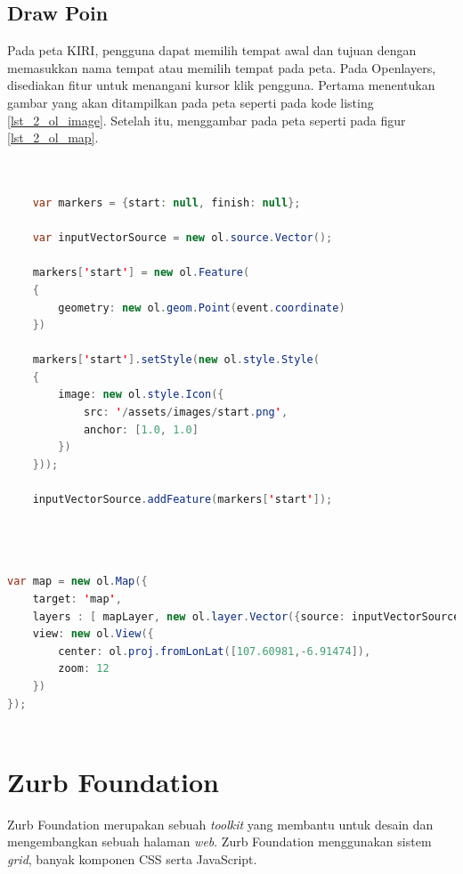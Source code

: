 \subsection{Draw Poin}
Pada peta KIRI, pengguna dapat memilih tempat awal dan tujuan dengan memasukkan nama tempat atau memilih tempat pada peta. Pada Openlayers, disediakan fitur untuk menangani kursor klik pengguna. Pertama menentukan gambar yang akan ditampilkan pada peta seperti pada kode listing \ref{lst_2_ol_image}. Setelah itu, menggambar pada peta seperti pada figur \ref{lst_2_ol_map}.


\begin{lstlisting}[caption=Menentukan gambar yang akan dipakai pada peta,label = {lst_2_ol_image},language=Java]

	
	var markers = {start: null, finish: null};
	
	var inputVectorSource = new ol.source.Vector();

	markers['start'] = new ol.Feature(
	{
		geometry: new ol.geom.Point(event.coordinate)
	})
	
	markers['start'].setStyle(new ol.style.Style(
	{
		image: new ol.style.Icon({
			src: '/assets/images/start.png',
			anchor: [1.0, 1.0]
		})
	}));
	
	inputVectorSource.addFeature(markers['start']);
	
	
\end{lstlisting}


\begin{lstlisting}[caption=Menambahkan vektor pada peta,label = {lst_2_ol_map},language=Java]
	
var map = new ol.Map({
    target: 'map',
    layers : [ mapLayer, new ol.layer.Vector({source: inputVectorSource}), new ol.layer.Vector({source: resultVectorSource}) ],
    view: new ol.View({
        center: ol.proj.fromLonLat([107.60981,-6.91474]),
        zoom: 12
    })
});
		
\end{lstlisting}

\section{Zurb Foundation}
\label{sec:zurbfoundation}

Zurb Foundation \cite{zurbfoundationbook} merupakan sebuah \textit{toolkit} yang membantu untuk desain dan mengembangkan sebuah halaman \textit{web}. Zurb Foundation menggunakan sistem \textit{grid}, banyak komponen CSS serta JavaScript. 

